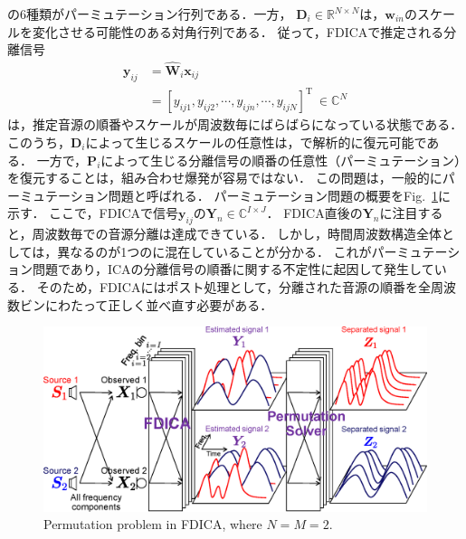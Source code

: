 の6種類がパーミュテーション行列である．一方，
$\bm{D}_i \in \mathbb{R}^{N \times N}$は，$\bm{w}_{in}$のスケールを変化させる可能性のある対角行列である．
従って，FDICAで推定される分離信号
\begin{align}
\bm{y}_{ij} &= \hat{\bm{W}}_i\bm{x}_{ij} \\
&=\left[ y_{ij1},y_{ij2}, \cdots, y_{ijn}, \cdots, y_{ijN} \right]^\mathrm{T}~\in \mathbb{C}^{N} \label{eq:sepSig}
\end{align}
は，推定音源の順番やスケールが周波数毎にばらばらになっている状態である．
このうち，$\bm{D}_i$によって生じるスケールの任意性は，\cite{Matsuoka2001_PB}で解析的に復元可能である．
一方で，$\bm{P}_i$によって生じる分離信号の順番の任意性（パーミュテーション）を復元することは，組み合わせ爆発が容易ではない．
この問題は，一般的にパーミュテーション問題と呼ばれる．
パーミュテーション問題の概要をFig.~\ref{fig:permu}に示す．
ここで，FDICAで信号$\bm{y}_{ij}$の$\bm{Y}_n \in \mathbb{C}^{I \times J}$．
FDICA直後の$\bm{Y}_n$に注目すると，周波数毎での音源分離は達成できている．
しかし，時間周波数構造全体としては，異なるのが1つのに混在していることが分かる．
これがパーミュテーション問題であり，ICAの分離信号の順番に関する不定性に起因して発生している．
そのため，FDICAにはポスト処理として，分離された音源の順番を全周波数ビンにわたって正しく並べ直す必要がある．
\begin{figure}[t]
    \begin{center}
        \includegraphics[width=0.95\columnwidth]{figures/permutation_image.eps}
    \end{center}
    \vspace{-8pt}
	\caption{Permutation problem in FDICA, where $N=M=2$.}
	\label{fig:permu}
\end{figure}
